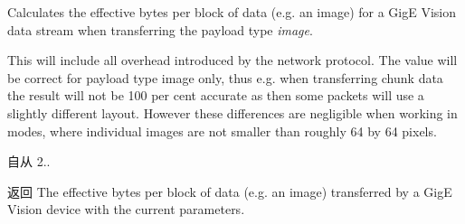 Calculates the effective bytes per block of data (e.\+g. an image) for a Gig\+E Vision data stream when transferring the payload type {\itshape image}. 

This will include all overhead introduced by the network protocol. The value will be correct for payload type image only, thus e.\+g. when transferring chunk data the result will not be 100 per cent accurate as then some packets will use a slightly different layout. However these differences are negligible when working in modes, where individual images are not smaller than roughly 64 by 64 pixels. \begin{DoxySince}{自从}
2.. 
\end{DoxySince}
\begin{DoxyReturn}{返回}
The effective bytes per block of data (e.\+g. an image) transferred by a Gig\+E Vision device with the current parameters. 
\end{DoxyReturn}

